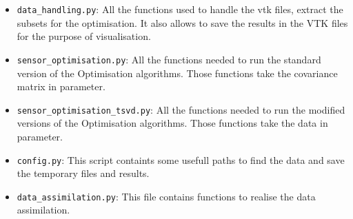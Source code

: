 \begin{itemize}
	\item \texttt{data\_handling.py}: All the functions used to handle the vtk files, extract the subsets for the optimisation. It also allows to save the results in the VTK files for the purpose of visualisation. 
	\item \texttt{sensor\_optimisation.py}: All the functions needed to run the standard version of the Optimisation algorithms. Those functions take the covariance matrix in parameter.  
	\item \texttt{sensor\_optimisation\_tsvd.py}:  All the functions needed to run the modified versions of the Optimisation algorithms. Those functions take the data in parameter. 
	\item \texttt{config.py}: This script containts some usefull paths to find the data and save the temporary files and results. 
	\item \texttt{data\_assimilation.py}: This file contains functions to realise the data assimilation. 
\end{itemize}